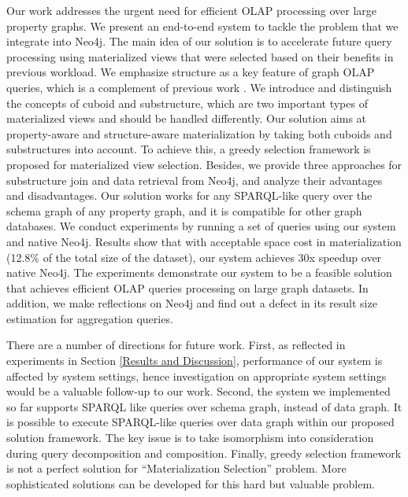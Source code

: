Our work addresses the urgent need for efficient OLAP processing over large property graphs.  We present an end-to-end system to tackle the problem that we integrate into Neo4j. The main idea of our solution is to accelerate future query processing using materialized views that were selected based on their benefits in previous workload. We emphasize structure as a key feature of graph OLAP queries, which is a complement of previous work \cite{sigmod11_ZhaoLXH11}. We introduce and distinguish the concepts of cuboid and substructure, which are two important types of materialized views and should be handled differently. Our solution aims at property-aware and structure-aware materialization by taking both cuboids and substructures into account. To achieve this, a greedy selection framework is proposed for materialized view selection. Besides, we provide three approaches for substructure join and data retrieval from Neo4j, and analyze their advantages and disadvantages. Our solution works for any SPARQL-like query over the schema graph of any property graph, and it is compatible for other graph databases. We conduct experiments by running a set of queries using our system and native Neo4j. Results show that with acceptable space cost in materialization (12.8\% of the total size of the dataset), our system achieves 30x speedup over native Neo4j. The experiments demonstrate our system to be a feasible solution that achieves efficient OLAP queries processing on large graph datasets. In addition, we make reflections on Neo4j and find out a defect in its result size estimation for aggregation queries.    

There are a number of directions for future work. First, as reflected in experiments in Section \ref{Results and Discussion}, performance of our system is affected by system settings, hence investigation on appropriate system settings would be a valuable follow-up to our work. Second, the system we implemented so far supports SPARQL like queries over schema graph, instead of data graph. It is possible to execute SPARQL-like queries over data graph within our proposed solution framework. The key issue is to take isomorphism into consideration during query decomposition and composition. Finally, greedy selection framework is not a perfect solution for ``Materialization Selection'' problem. More sophisticated solutions can be developed for this hard but valuable problem.


